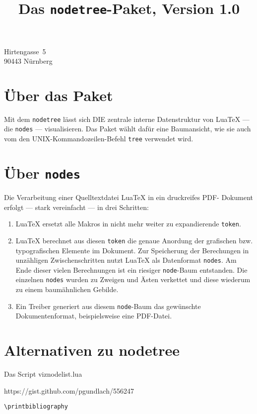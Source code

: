 \documentclass[ngerman]{dtk}
\let\Package\texttt
\begin{document}
\title{Das \texttt{nodetree}-Paket, Version 1.0}
    {Hirtengasse~5\\
     90443 Nürnberg\\
     }
\maketitle

\section{Über das Paket}

Mit dem \Package{nodetree} lässt sich DIE zentrale interne Datenstruktur
von Lua\TeX{} --- die \texttt{nodes} --- visualisieren. Das Paket wählt
dafür eine Baumansicht, wie sie auch vom den UNIX-Kommandozeilen-Befehl
\texttt{tree} verwendet wird.

\section{Über \texttt{nodes}}

Die Verarbeitung einer Quelltextdatei Lua\TeX{} in ein druckreifes PDF-%
Dokument erfolgt --- stark vereinfacht --- in drei Schritten:

\begin{enumerate}
\item Lua\TeX{} ersetzt alle Makros in nicht mehr weiter zu
expandierende \texttt{token}.

\item Lua\TeX{} berechnet aus diesen \texttt{token} die genaue Anordung
der grafischen bzw. typografischen Elemente im Dokument. Zur Speicherung
der Berechungen in unzähligen Zwischenschritten nutzt Lua\TeX{} als
Datenformat \texttt{nodes}. Am Ende dieser vielen Berechnungen ist ein
riesiger \texttt{node}-Baum entstanden. Die einzelnen \texttt{nodes}
wurden zu Zweigen und Ästen verkettet und diese wiederum zu einem
baumähnlichen Gebilde.

\item Ein Treiber generiert aus diesem \texttt{node}-Baum das gewünschte
Dokumentenformat, beispielsweise eine PDF-Datei.
\end{enumerate}

\section{Alternativen zu nodetree}

Das Script viznodelist.lua

https://gist.github.com/pgundlach/556247


\begin{lstlisting}[style=number]
\printbibliography
\end{lstlisting}

\nocite{*}
\printbibliography
\end{document}
